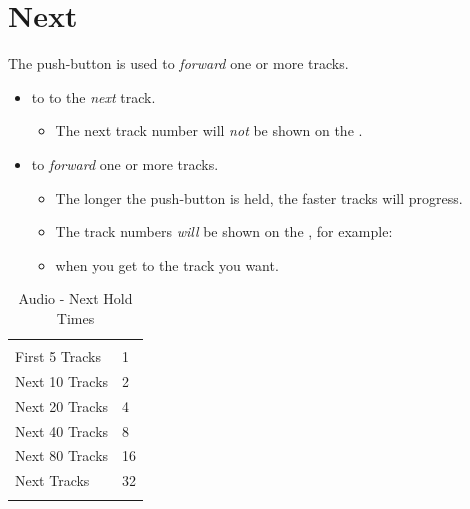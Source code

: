 \section{Next} \label{Audio - Next}

The \thinspace\sNe\enspace push-button is used to  \textit{forward}
one or more tracks.  

\begin{itemize}
  \item {} to  to the \textit{next} track.
    \begin{itemize}
      \item The next track number will \textit{not} be shown on the .
    \end{itemize}
  \item {} to  \textit{forward} one or more tracks.
    \begin{itemize}
      \item The longer the push-button is held, the faster tracks will progress.
      \item The track numbers \textit{will} be shown on the , for
        example:
      \item {} when you get to the track you want.
    \end{itemize}
\end{itemize}


\begin{table}[H]
\centering
\begin{tabu} { X[1,c,m] | X[1,c,m] }
  \thrule
   &  \\ \mrule
  First \num{5} Tracks & \num{1} \\ 
  Next \num{10} Tracks & \num{2} \\ 
  Next \num{20} Tracks & \num{4} \\ 
  Next \num{40} Tracks & \num{8} \\ 
  Next \num{80} Tracks & \num{16} \\ 
  Next \textit{\large{}} Tracks & \num{32} \\
  \bhrule
\end{tabu}
\caption{Audio - Next Hold Times}
\end{table}

